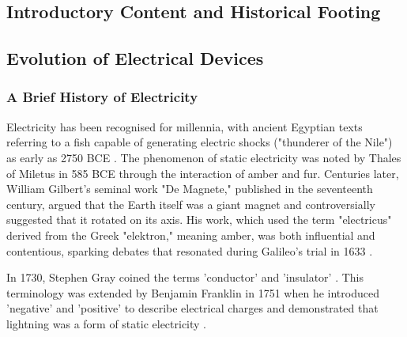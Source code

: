 \begin{refsection}
\chapter{Introductory Content and Historical Footing}

\ifpdf
    \graphicspath{{Chapter1/Figs/Raster/}{Chapter1/Figs/PDF/}{Chapter1/Figs/}}
\else
    \graphicspath{{Chapter1/Figs/Vector/}{Chapter1/Figs/}}
\fi

\label{ch:semiconductors_and_diamond}

\section{Evolution of Electrical Devices}
\subsection{A Brief History of Electricity}
Electricity has been recognised for millennia, with ancient Egyptian texts referring to a fish capable of generating electric shocks ("thunderer of the Nile") as early as 2750 BCE \cite{moller1991}. The phenomenon of static electricity was noted by Thales of Miletus in 585 BCE through the interaction of amber and fur. Centuries later, William Gilbert's seminal work "De Magnete," published in the seventeenth century, argued that the Earth itself was a giant magnet and controversially suggested that it rotated on its axis. His work, which used the term "electricus" derived from the Greek "elektron," meaning amber, was both influential and contentious, sparking debates that resonated during Galileo's trial in 1633 \cite{gilbert1600, linder2002}.

In 1730, Stephen Gray coined the terms 'conductor' and 'insulator' \cite{carnle1931}. This terminology was extended by Benjamin Franklin in 1751 when he introduced 'negative' and 'positive' to describe electrical charges and demonstrated that lightning was a form of static electricity \cite{park1898, uman1986}.


\end{refsection}
